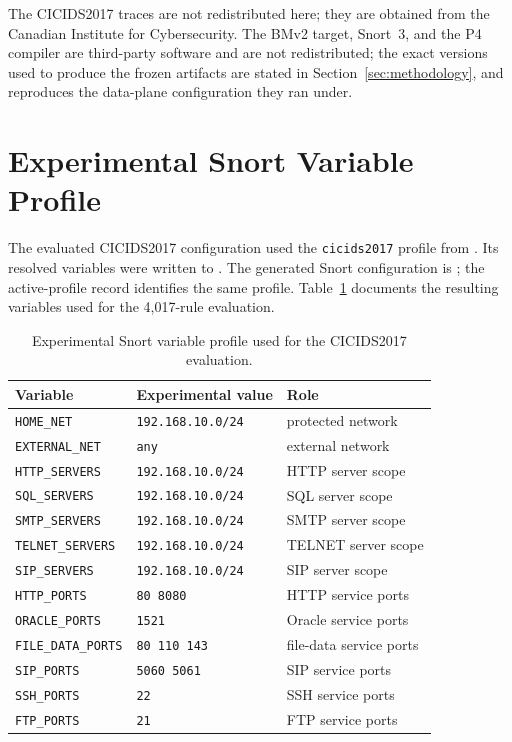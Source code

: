 \documentclass{article}
\begin{document}
The CICIDS2017 traces are not redistributed here; they are obtained from the
Canadian Institute for Cybersecurity. The BMv2 target, Snort~3, and the P4
compiler are third-party software and are not redistributed; the exact
versions used to produce the frozen artifacts are stated in
Section~\ref{sec:methodology}, and  reproduces the
data-plane configuration they ran under.

\appendix
\section{Experimental Snort Variable Profile}
\label{app:snort-profile}
The evaluated CICIDS2017 configuration used the \texttt{cicids2017} profile
from . Its resolved variables were
written to . The generated Snort
configuration is ; the active-profile
record identifies the same profile. Table~\ref{tab:snort-profile} documents
the resulting variables used for the 4,017-rule evaluation.

\begin{table}[t]
\centering
\small
\caption{Experimental Snort variable profile used for the CICIDS2017
evaluation.}
\label{tab:snort-profile}
\begin{tabular}{lll}
\toprule
\textbf{Variable} & \textbf{Experimental value} & \textbf{Role} \\
\midrule
\texttt{HOME\_NET} & \texttt{192.168.10.0/24} & protected network \\
\texttt{EXTERNAL\_NET} & \texttt{any} & external network \\
\texttt{HTTP\_SERVERS} & \texttt{192.168.10.0/24} & HTTP server scope \\
\texttt{SQL\_SERVERS} & \texttt{192.168.10.0/24} & SQL server scope \\
\texttt{SMTP\_SERVERS} & \texttt{192.168.10.0/24} & SMTP server scope \\
\texttt{TELNET\_SERVERS} & \texttt{192.168.10.0/24} & TELNET server scope \\
\texttt{SIP\_SERVERS} & \texttt{192.168.10.0/24} & SIP server scope \\
\texttt{HTTP\_PORTS} & \texttt{80 8080} & HTTP service ports \\
\texttt{ORACLE\_PORTS} & \texttt{1521} & Oracle service ports \\
\texttt{FILE\_DATA\_PORTS} & \texttt{80 110 143} & file-data service ports \\
\texttt{SIP\_PORTS} & \texttt{5060 5061} & SIP service ports \\
\texttt{SSH\_PORTS} & \texttt{22} & SSH service ports \\
\texttt{FTP\_PORTS} & \texttt{21} & FTP service ports \\
\bottomrule
\end{tabular}
\end{table}
\end{document}
